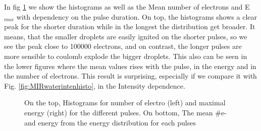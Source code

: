 In fig \ref{Hepulsedur} we show the histograms as well as the Mean number of electrons and E$_{max}$  with dependency on the pulse duration. On top, the histograms shows a clear peak for the shorter duration while in the longest the distribution get broader. It means, that the smaller droplets are easily ignited on the shorter pulses, so we see the peak close to 100000 electrons, and on contrast, the longer pulses are more sensible to coulomb explode the bigger droplets. This also can be seen in the lower figures where the mean values rises with the pulse, in the energy and in the number of electrons. This result is surprising, especially if we compare it with Fig. \ref{fig:MIRwaterintenhisto}, in the Intensity dependence. 


\begin{figure}[htb]
\captionsetup[subfloat]{farskip=2pt,captionskip=1pt}
\centering
\hspace*{\fill}%
\hspace*{\fill}%
\hspace*{\fill}%
\caption[MIR He pulse scan. Mean values and Histograms]{On the top, Histograms for number of electro (left) and maximal energy (right) for the different pulses. On bottom, The mean $\#$e- and energy from the energy distribution for each pulses}
\label{Hepulsedur}
\end{figure}


